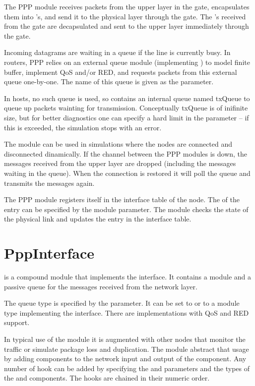 The PPP module receives packets from the upper layer in the 
gate, encapsulates them into 's, and send it to the
physical layer through the  gate. The 's
received from the  gate are decapsulated and sent to the upper
layer immediately through the  gate.

Incoming datagrams are waiting in a queue if the line is currently busy.
In routers, PPP relies on an external queue module (implementing
) to model finite buffer, implement QoS and/or RED,
and requests packets from this external queue one-by-one. The name
of this queue is given as the  parameter.

In hosts, no such queue is used, so  contains an internal
queue named txQueue to queue up packets wainting for transmission.
Conceptually txQueue is of inifinite size, but for better diagnostics
one can specify a hard limit in the  parameter -- if
this is exceeded, the simulation stops with an error.

The module can be used in simulations where the nodes are connected and
disconnected dinamically. If the channel between the PPP modules is down,
the messages received from the upper layer are dropped (including the messages
waiting in the queue). When the connection is restored it will
poll the queue and transmits the messages again.

The PPP module registers itself in the interface table of the node.
The  of the entry can be specified by the
 module parameter. The module checks the state of the physical link
and updates the entry in the interface table.

\section{PppInterface}
\label{sec:ppp:pppinterface}

 is a compound module that implements the
 interface. It contains a 
module and a passive queue for the messages received from the network layer.

The queue type is specified by the  parameter.
It can be set to  or to a module type implementing
the  interface. There are implementations
with QoS and RED support.

In typical use of the  module it is augmented with other nodes
that monitor the traffic or simulate package loss and duplication.
The  module abstract that usage by adding
 components to the network input and output of the
 component. Any number of hook can be added by
specifying the  and 
parameters and the types of the  and 
components. The hooks are chained in their numeric order.




